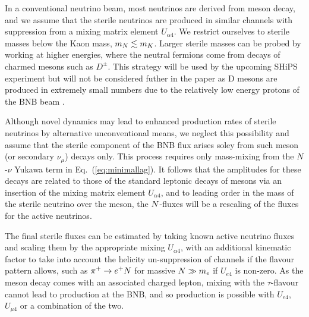 \documentclass[11pt, a4paper]{article}
\newcommand{\refeq}[1]{Eq.~(\ref{#1})}
\def\ster{\ensuremath N}
\begin{document}
In a conventional neutrino beam, most neutrinos are derived from meson decay,
and we assume that the sterile neutrinos are produced in similar channels with
suppression from a mixing matrix element $U_{\alpha 4}$. We restrict ourselves
to sterile masses below the Kaon mass, $m_{\ster}\lesssim m_K$. 
%
Larger sterile masses can be probed by working at higher energies, where the
neutral fermions come from decays of charmed mesons such as $D^\pm$. This
strategy will be used by the upcoming SHiPS experiment \cite{Alekhin:2015byh,
Anelli:2015pba} but will not be considered futher in the paper as D mesons are
produced in extremely small numbers due to the relatively low energy protons of
the BNB beam \cite{AguilarArevalo:2008yp}.

Although novel dynamics may lead to enhanced production rates of sterile
neutrinos by alternative unconventional means, we neglect this possibility and
assume that the sterile component of the BNB flux arises soley from such meson
(or secondary $\nu_\mu$) decays only. This process requires only mass-mixing
from the $N$-$\nu$ Yukawa term in \refeq{eq:minimallag}. It follows that the
amplitudes for these decays are related to those of the standard leptonic
decays of mesons via an insertion of the mixing matrix element $U_{\alpha 4}$,
and to leading order in the mass of the sterile neutrino over the meson, the
$\ster$-fluxes will be a rescaling of the fluxes for the active neutrinos. 

The final sterile fluxes can be estimated by taking known active neutrino
fluxes and scaling them by the appropriate mixing $U_{\alpha 4}$, with an
additional kinematic factor to take into account the helicity un-suppression of
channels if the flavour pattern allows, such as $\pi^+ \rightarrow e^+\ster$
for massive $\ster \gg m_e$ if $U_{e4}$ is non-zero. As the meson decay comes
with an associated charged lepton, mixing with the $\tau$-flavour cannot lead
to production at the BNB, and so production is possible with $U_{e4}$, $U_{\mu
4}$ or a combination of the two.
\end{document}
